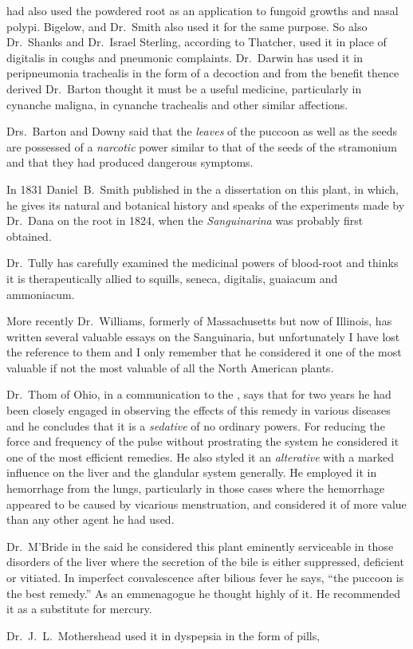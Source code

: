 had also used the powdered root as an application to fungoid growths
and nasal polypi. Bigelow, and Dr.~Smith also used it for the same
purpose. So also Dr.~Shanks and Dr.~Israel Sterling, according to
Thatcher, used it in place of digitalis in coughs and pneumonic complaints.
Dr.~Darwin has used it in peripneumonia trachealis in the
form of a decoction and from the benefit thence derived Dr.~Barton
thought it must be a useful medicine, particularly in cynanche maligna,
in cynanche trachealis and other similar affections.

Drs.~Barton and Downy said that the \emph{leaves} of the puccoon as well as
the seeds are possessed of a \emph{narcotic} power similar to that of the seeds
of the stramonium and that they had produced dangerous symptoms.

In 1831 Daniel~B.~Smith published in the  a dissertation on this plant, in which,
he gives its natural and botanical history and speaks of the experiments
made by Dr.~Dana on the root in 1824, when the \emph{Sanguinarina} was
probably first obtained.

Dr.~Tully has carefully examined the medicinal powers of blood-root
and thinks it is therapeutically allied to squills, seneca, digitalis, guaiacum
and ammoniacum.

More recently Dr.~Williams, formerly of Massachusetts but now of
Illinois, has written several valuable essays on the Sanguinaria, but
unfortunately I have lost the reference to them and I only remember
that he considered it one of the most valuable if not the most valuable
of all the North American plants.

Dr.~Thom of Ohio, in a communication to the ,
says that for two years he had been closely engaged in observing the
effects of this remedy in various diseases and he concludes that it is a
\emph{sedative} of no ordinary powers. For reducing the force and frequency
of the pulse without prostrating the system he considered it one of the
most efficient remedies. He also styled it an \emph{alterative} with a marked
influence on the liver and the glandular system generally. He employed
it in hemorrhage from the lungs, particularly in those cases where
the hemorrhage appeared to be caused by vicarious menstruation, and
considered it of more value than any other agent he had used.

Dr.~M'Bride in the  said he considered this
plant eminently serviceable in those disorders of the liver where the
secretion of the bile is either suppressed, deficient or vitiated. In imperfect
convalescence after bilious fever he says, ``the puccoon is the
best remedy.'' As an emmenagogue he thought highly of it. He
recommended it as a substitute for mercury.

Dr.~J.~L.\ Mothershead used it in dyspepsia in the form of pills,\endinput
